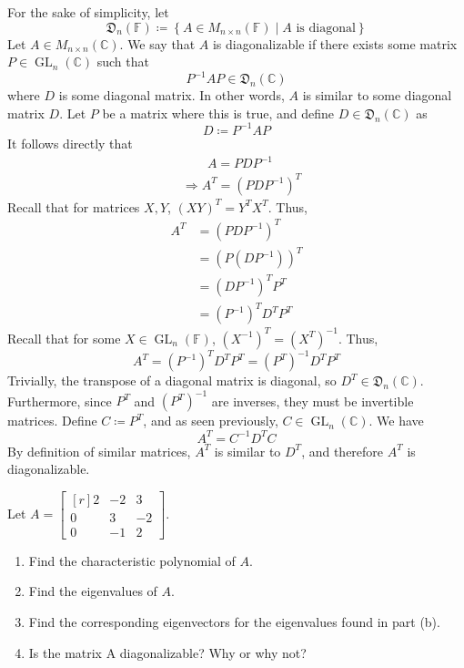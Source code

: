 \documentclass{article}
\theoremstyle{definition}
\renewenvironment{proof}[1][\proofname]{\begin{replacementproof}}{\end{replacementproof}}
\begin{document}
\begin{proof}
  For the sake of simplicity, let
  \[
    \mathfrak{D}_n (\mathbb{F})\coloneqq \left\{ A\in M_{n\times n}(\mathbb{F}) \mid A\text{ is diagonal} \right\}
  \]
  Let \(A\in M_{n\times n}(\mathbb{C})\). We say that \(A\) is diagonalizable if there exists some matrix \(P\in \operatorname{GL}_n(\mathbb{C}) \) such that
  \[
   P ^{-1}  AP \in \mathfrak{D}_n (\mathbb{C}) 
  \]
  where \(D\) is some diagonal matrix. In other words, \(A\) is similar to some diagonal matrix \(D\). Let \(P\) be a matrix where this is true, and define \(D\in \mathfrak{D}_n(\mathbb{C}) \) as
  \[
    D\coloneqq  P ^{-1}  AP
  \]
  It follows directly that
  \begin{align*}
    &\qquad A = PDP ^{-1} \\
    &\Longrightarrow A^{T} = \left( PDP ^{-1}  \right)^T
  \end{align*}
  Recall that for matrices \(X,Y\), \((XY)^T = Y^T X^T\). Thus,
  \begin{align*}
    A^{T} &= \left( PDP ^{-1}  \right)^T\\
    &= \left( P \left( DP ^{-1}  \right)  \right)^T\\
    &= \left( DP ^{-1}  \right)^T P^T\\
    &=\left( P ^{-1}  \right)^T D^T P^T
  \end{align*}
  Recall that for some \(X\in \operatorname{GL}_n(\mathbb{F}) \), \(\left( X ^{-1}  \right)^T =\left( X^T \right)^{-1}   \). Thus,
  \[
    A^T = \left( P ^{-1}  \right)^T D^T P^T = \left( P^T \right) ^{-1} D^T P^T
  \]
  Trivially, the transpose of a diagonal matrix is diagonal, so \(D^T \in \mathfrak{D}_n(\mathbb{C}) \). Furthermore, since \(P^T\) and \(\left( P^T \right)^{-1}  \) are inverses, they must be invertible matrices. Define \(C \coloneqq  P^T\), and as seen previously, \(C\in \operatorname{GL}_n(\mathbb{C}) \). We have 
  \[
    A^T = C^{-1} D^TC
  \]
  By definition of similar matrices, \(A^T\) is similar to \(D^T\), and therefore \(A^T\) is diagonalizable.
\end{proof}
\begin{exercise}
  Let $A=\begin{bmatrix*}[r] 2&-2&3\\0&3&-2\\0&-1&2 \end{bmatrix*}$.
\begin{enumerate}
\item Find the characteristic polynomial of $A$.
\item Find the eigenvalues of $A$. 
\item Find the corresponding eigenvectors for the eigenvalues found in part (b). 
\item Is the matrix A diagonalizable?  Why or why not? \\
\end{enumerate}
\end{exercise}
\end{document}

